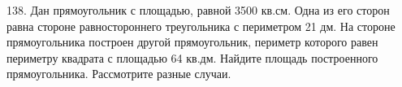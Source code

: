 138. Дан прямоугольник с площадью, равной 3500 кв.см. Одна из его сторон равна стороне равностороннего треугольника с периметром 21 дм. На стороне прямоугольника построен другой прямоугольник, периметр которого равен периметру квадрата с площадью 64 кв.дм. Найдите площадь построенного прямоугольника. Рассмотрите разные случаи.\\
